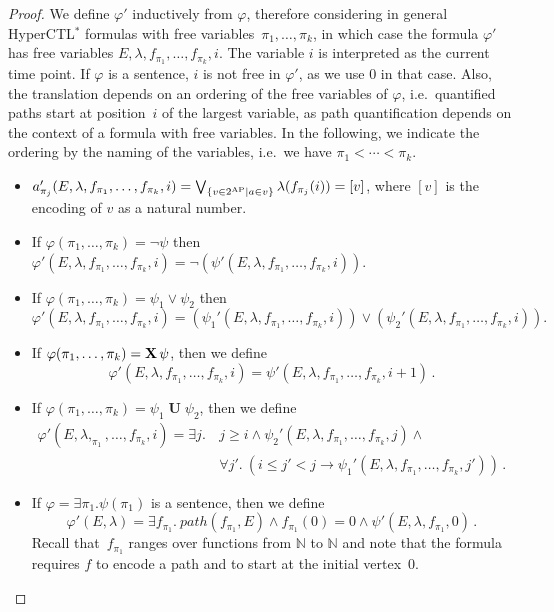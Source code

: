 \documentclass[dvipsnames,10pt,a4paper]{amsart}
\theoremstyle{definition}
\theoremstyle{remark}
\newcommand{\nats}{\mathbb{N}}
\renewcommand{\phi}{\varphi}
\DeclareMathOperator{\U}{\mathbf{U}}
\newcommand{\X}{\mathop{\mathbf{X}\vphantom{a}}\nolimits}
\newcommand{\hyctlstar}{{HyperCTL$^*$}\xspace}
\newcommand\AP{\textup{AP}}
\renewcommand{\phi}{\varphi}
\begin{document}
\begin{proof}
  We define $\phi'$ inductively from $\phi$, therefore considering in general
  \hyctlstar formulas with free variables~$\pi_1,\ldots,\pi_k$, in which case the formula $\phi'$ has free variables
  $E,\lambda,f_{\pi_1},\ldots,f_{\pi_k},i$.
  The variable $i$ is interpreted as the current time point.
  If $\phi$ is a sentence, $i$ is not free in $\phi'$, as we use $0$ in that case.
Also, the translation depends on an ordering of the free variables of $\phi$, i.e.\  quantified paths start at position~$i$ of the largest variable, as path quantification depends on the context of a formula with free variables.
In the following, we indicate the ordering by the naming of the variables, i.e.\ we have  $\pi_1 <\cdots <\pi_k$.
  \begin{itemize}
   
    \item $a'_{\pi_j}(E,\lambda,f_{\pi_1},\ldots, f_{\pi_k} ,i) =
    \bigvee_{\{v \in 2^\AP \mid a \in v\}} \lambda(f_{\pi_j}(i)) = [v]$,
    where $[v]$ is the encoding of $v$ as a natural number.
     
  \item If $\phi(\pi_1, \ldots, \pi_k) = \lnot \psi$ then $\phi'(E,\lambda,f_{\pi_1},\ldots, f_{\pi_k} ,i) = \neg (\psi'(E,\lambda,f_{\pi_1},\ldots, f_{\pi_k} ,i))$.
     
  \item If $\phi(\pi_1, \ldots, \pi_k) = \psi_1 \lor \psi_2 $ then \[\phi'(E,\lambda,f_{\pi_1},\ldots, f_{\pi_k} ,i) = (\psi_1'(E,\lambda,f_{\pi_1},\ldots, f_{\pi_k} ,i))\lor(\psi_2'(E,\lambda,f_{\pi_1},\ldots, f_{\pi_k} ,i)).\]
   
  \item If $\phi(\pi_1,\ldots,\pi_k) = \X \psi$,  then we define
    \[
      \phi'(E,\lambda,f_{\pi_1},\ldots,f_{\pi_k},i) =
      \psi'(E,\lambda,f_{\pi_1},\ldots,f_{\pi_k},i+1) \, .
    \]
     
  \item If $\phi(\pi_1,\ldots,\pi_k) = \psi_1 \U \psi_2$,  then we define
    \begin{align*}
      \phi'(E,\lambda,_{\pi_1},\ldots,f_{\pi_k},i) =
      \exists j.\,
      & j \ge i \land 
       \psi_2'(E,\lambda,f_{\pi_1},\ldots,f_{\pi_k},j) \land {} \\
      & \forall j'.\  (i \le j' < j \rightarrow
        \psi_1'(E,\lambda,f_{\pi_1},\ldots,f_{\pi_k},j')) \, .
    \end{align*}
   
  \item
    If $\phi = \exists \pi_1. \psi(\pi_1)$ is a sentence, then we define
    \[
      \phi'(E,\lambda) = \exists f_{\pi_1}.\ 
      \mathit{path}(f_{\pi_1},E) \land f_{\pi_1}(0) = 0 \land
      \psi'(E,\lambda,f_{\pi_1},0) \, .
    \]
    Recall that~$f_{\pi_1}$ ranges over functions from $\nats$ to $\nats$ and note that the formula requires $f$ to encode a path and to start at the initial vertex~$0$.
    

\end{itemize}
\end{proof}
\end{document}
